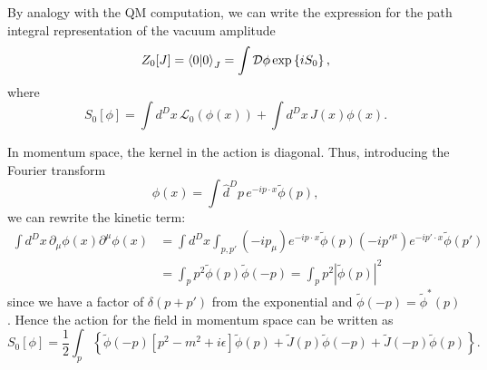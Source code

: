 \documentclass{article}
\numberwithin{equation}{section}
\begin{document}
By analogy with the QM computation, we can write the expression for the path integral representation of the vacuum amplitude
\begin{equation} \label{eq:vacuum_amplitude}
    Z_0[J] = \braket{0}{0}_J = \int \mathcal{D} \phi \exp\left\{i S_0\right\},
\end{equation}
where
\begin{equation}
    S_0[\phi] = \int d^Dx\, \mathcal{L}_0(\phi(x)) + \int d^Dx\, J(x) \phi(x).
\end{equation}

In momentum space, the kernel in the action is diagonal. Thus, introducing the Fourier transform
\begin{equation}
    \phi(x) = \int \hat{d}^Dp\, e^{-ip \cdot x} \tilde{\phi}(p),
\end{equation}
we can rewrite the kinetic term:
\begin{equation}
\begin{aligned}
    \int d^Dx\, \partial_\mu \phi(x) \partial^\mu \phi(x) &= \int d^Dx \int_{p, p'} (-ip_\mu) e^{-ip\cdot x} \tilde{\phi}(p) (-ip'^\mu) e^{-ip'\cdot x} \tilde{\phi}(p') \\
    &= \int_p p^2 \tilde{\phi}(p) \tilde{\phi}(-p) = \int_p p^2 |\tilde{\phi}(p)|^2
\end{aligned}
\end{equation} 
since we have a factor of $\delta(p + p')$ from the exponential and $\tilde{\phi}(-p) = \tilde{\phi}^*(p)$. Hence the action for the field in momentum space can be written as 
\begin{equation}
    S_0[\phi] = \frac{1}{2} \int_p \left\{\tilde{\phi}(-p)\left[p^2-m^2 + i\epsilon\right] \tilde{\phi}(p) + \tilde{J}(p) \tilde{\phi}(-p) + \tilde{J}(-p) \tilde{\phi}(p)\right\}.
\end{equation}
\end{document}
